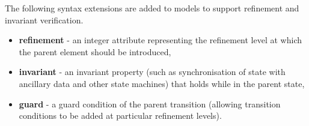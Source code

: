 The following syntax extensions are added to \SCXML models to support refinement and invariant verification. 
\begin{itemize}
	\item \textbf{refinement} - an integer attribute representing the refinement level at which the parent element should be introduced,
	\item \textbf{invariant} - an invariant property (such as synchronisation of state with ancillary data and other state machines) that holds while in the parent state,
	\item \textbf{guard} - a guard condition of the parent transition (allowing transition conditions to be added at particular refinement levels). 
\end{itemize}
